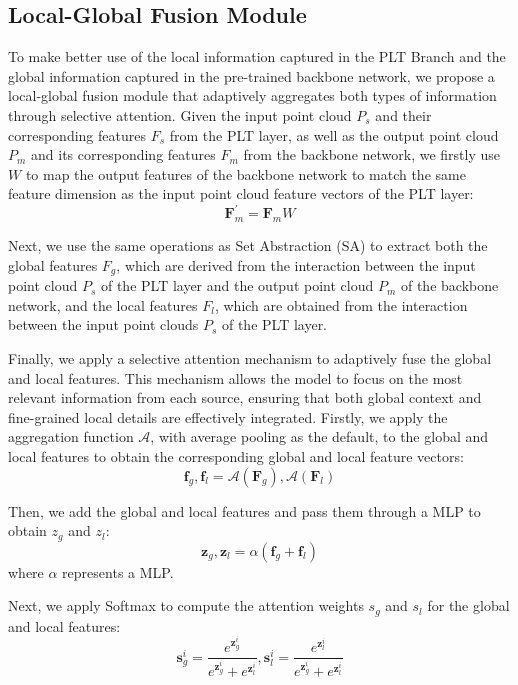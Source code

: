 \subsection{Local-Global Fusion Module}
To make better use of the local information captured in the PLT Branch and the global information captured in the pre-trained backbone network, we propose a local-global fusion module that adaptively aggregates both types of information through selective attention. Given the input point cloud $P_{s}$ and their corresponding features $F_{s}$ from the PLT layer, as well as the output point cloud $P_{m}$ and its corresponding features $F_{m}$ from the backbone network, we firstly use $W$ to map the output features of the backbone network to match the same feature dimension as the input point cloud feature vectors of the PLT layer:
\begin{equation}
    \boldsymbol{F}_{m}^{'} = \boldsymbol{F}_mW 
\end{equation}

Next, we use the same operations as Set Abstraction (SA) to extract both the global features $F_g$, which are derived from the interaction between the input point cloud $P_s$ of the PLT layer and the output point cloud $P_m$ of the backbone network, and the local features $F_l$, which are obtained from the interaction between the input point clouds $P_s$ of the PLT layer.

Finally, we apply a selective attention mechanism to adaptively fuse the global and local features. This mechanism allows the model to focus on the most relevant information from each source, ensuring that both global context and fine-grained local details are effectively integrated. Firstly, we apply the aggregation function $\mathcal{A}$, with average pooling as the default, to the global and local features to obtain the corresponding global and local feature vectors:
\begin{equation}
    \boldsymbol{f}_g, \boldsymbol{f}_l = \mathcal{A}(\boldsymbol{F}_g),  \mathcal{A}(\boldsymbol{F}_l)
\end{equation}

Then, we add the global and local features and pass them through a MLP to obtain $z_g$ and $z_l$:
\begin{equation}
    \boldsymbol{z}_g, \boldsymbol{z}_l = \alpha \left( \boldsymbol{f}_g + \boldsymbol{f}_l \right)
\end{equation}
where $\alpha$ represents a MLP.

Next, we apply Softmax to compute the attention weights $s_g$ and $s_l$ for the global and local features:
\begin{equation}
    \boldsymbol{s}_g^i = \frac{e^{\boldsymbol{z}_g^i}}{e^{\boldsymbol{z}_g^i} + e^{\boldsymbol{z}_l^i}}, \boldsymbol{s}_l^i = \frac{e^{\boldsymbol{z}_l^i}}{e^{\boldsymbol{z}_g^i} + e^{\boldsymbol{z}_l^i}}
\end{equation}

